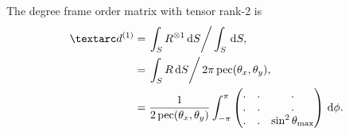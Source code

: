 
The  degree frame order matrix with tensor rank-2 is
\begin{subequations} \label{eq: pseudo-ellipse, free rotor 1st degree frame order matrix}
\begin{align}
    \FOone &= \left. \int_S R^{\otimes 1} \diff S \right / \int_S \diff S , \\
           &= \left. \int_S R \diff S \right / 2\pi \pec(\conethetax, \conethetay) , \\
           &= \frac{1}{2\pec(\conethetax, \conethetay)}
                \int_{-\pi}^{\pi}
                \begin{pmatrix}
                    . & . & . \\
                    . & . & . \\
                    . & . & \sin^2\conethetamax \\
                \end{pmatrix}
                \diff\phi .
\end{align}
\end{subequations}



